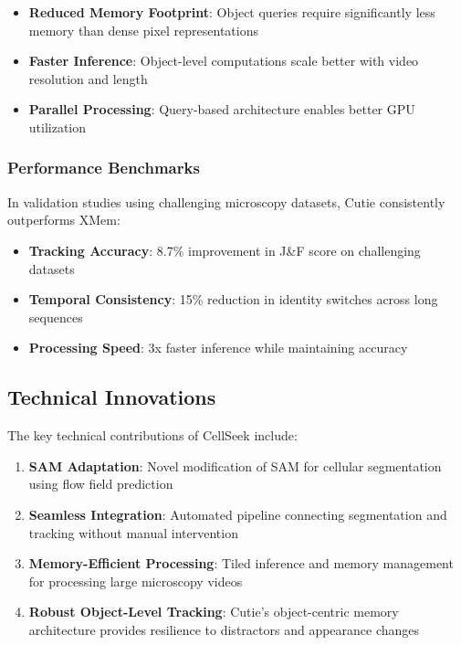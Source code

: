 \documentclass[12pt]{article}
\begin{document}
\begin{itemize}
  \item \textbf{Reduced Memory Footprint}: Object queries require significantly less memory than dense pixel representations
  \item \textbf{Faster Inference}: Object-level computations scale better with video resolution and length
  \item \textbf{Parallel Processing}: Query-based architecture enables better GPU utilization
\end{itemize}

\subsubsection{Performance Benchmarks}

In validation studies using challenging microscopy datasets, Cutie consistently outperforms XMem:

\begin{itemize}
  \item \textbf{Tracking Accuracy}: 8.7\% improvement in J\&F score on challenging datasets
  \item \textbf{Temporal Consistency}: 15\% reduction in identity switches across long sequences
  \item \textbf{Processing Speed}: 3x faster inference while maintaining accuracy
\end{itemize}

\subsection{Technical Innovations}

The key technical contributions of CellSeek include:

\begin{enumerate}
  \item \textbf{SAM Adaptation}: Novel modification of SAM for cellular segmentation using flow field prediction
  \item \textbf{Seamless Integration}: Automated pipeline connecting segmentation and tracking without manual intervention
  \item \textbf{Memory-Efficient Processing}: Tiled inference and memory management for processing large microscopy videos
  \item \textbf{Robust Object-Level Tracking}: Cutie's object-centric memory architecture provides resilience to distractors and appearance changes
\end{enumerate}
\end{document}

